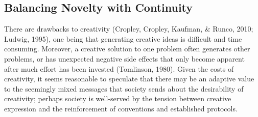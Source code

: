\documentclass[a4paper,12pt,man,british]{apa6}
\begin{document}

\subsection{Balancing Novelty with Continuity}
There are drawbacks to creativity (Cropley, Cropley, Kaufman, \& Runco, 2010; Ludwig, 1995), one being that generating creative ideas is difficult and time consuming. Moreover, a creative solution to one problem often generates other problems, or has unexpected negative side effects that only become apparent after much effort has been invested (Tomlinson, 1980).
Given the costs of creativity, 
it seems reasonable to speculate that there may be an adaptive value to the seemingly mixed messages that society sends about the desirability of creativity; perhaps society is well-served by the tension between creative expression and the reinforcement of conventions and established protocols. 
\end{document}
